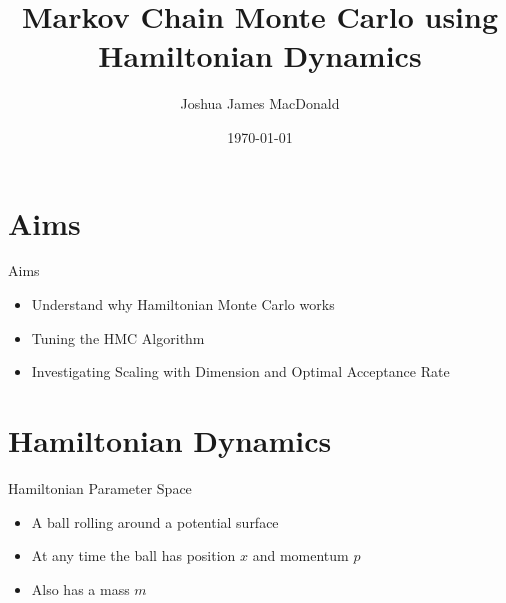 \documentclass{beamer}
\title[MCMC using Hamiltonian Dynamics]{Markov Chain Monte Carlo using Hamiltonian Dynamics}
\author{Joshua James MacDonald}
\institute{}
\date{\today}
\begin{document}

\begin{frame}
  \titlepage
\end{frame}




\section{Aims}

\begin{frame}{Aims}

\begin{itemize}

\item Understand why Hamiltonian Monte Carlo works \vskip 5mm

\item Tuning the HMC Algorithm \vskip 5mm

\item Investigating Scaling with Dimension and Optimal Acceptance Rate 
\end{itemize}

\end{frame}


\section{Hamiltonian Dynamics}



\begin{frame}{Hamiltonian Parameter Space}
\begin{itemize}
\item A ball rolling around a potential surface \vskip 5mm
\item At any time the ball has position $x$ and momentum $p$ \vskip 5mm
\item Also has a mass $m$ \vskip 5mm
\end{itemize}
\end{frame}
\end{document}
